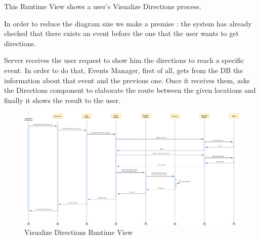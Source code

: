 This Runtime View shows a user's Visualize Directions process.\par
In order to reduce the diagram size we make a premise : the system has already checked that there exists an event before the one that the user wants to get directions.\par
Server receives the user request to show him the directions to reach a specific event. In order to do that, Events Manager, first of all, gets from the DB the information about that event and the previous one. Once it receives them, asks the Directions component to elaborate the route between the given locations and finally it shows the result to the user.
\begin{figure}[H]
	\centering
	\includegraphics[scale=0.16]{Images/Runtime/Visualize_Directions}
	\caption{Visualize Directions Runtime View}
\end{figure}

